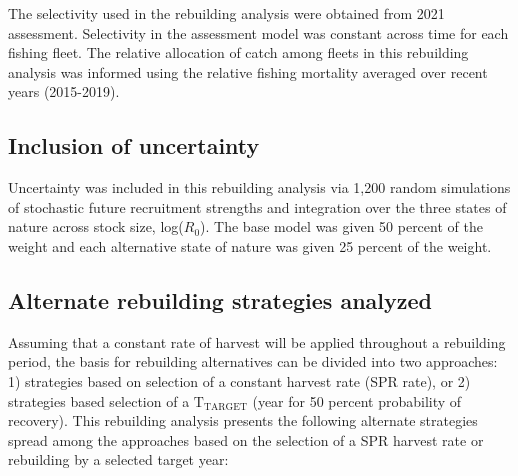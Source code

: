 \documentclass[11pt,
  english,
  a4paper,
]{article}
\begin{document}
The selectivity used in the rebuilding analysis were obtained from 2021 assessment. Selectivity in the assessment model was constant across time for each fishing fleet. The relative allocation of catch among fleets in this rebuilding analysis was informed using the relative fishing mortality averaged over recent years (2015-2019).

\leavevmode\tagmcend\tagstructend\par


\hypertarget{inclusion-of-uncertainty}{%
\subsection{Inclusion of uncertainty}\label{inclusion-of-uncertainty}}

\leavevmode\tagmcend\tagstructend


Uncertainty was included in this rebuilding analysis via 1,200 random simulations of stochastic future recruitment strengths and integration over the three states of nature across stock size, log({\(R_0\)\leavevmode\tagmcend\tagstructend}). The base model was given 50 percent of the weight and each alternative state of nature was given 25 percent of the weight.

\leavevmode\tagmcend\tagstructend\par


\hypertarget{alternate-rebuilding-strategies-analyzed}{%
\subsection{Alternate rebuilding strategies analyzed}\label{alternate-rebuilding-strategies-analyzed}}

\leavevmode\tagmcend\tagstructend


Assuming that a constant rate of harvest will be applied throughout a rebuilding period, the basis for rebuilding alternatives can be divided into two approaches: 1) strategies based on selection of a constant harvest rate (SPR rate), or 2) strategies based selection of a {\(\text{T}_\text{TARGET}\)\leavevmode\tagmcend\tagstructend} (year for 50 percent probability of recovery). This rebuilding analysis presents the following alternate strategies spread among the approaches based on the selection of a SPR harvest rate or rebuilding by a selected target year:
\end{document}
